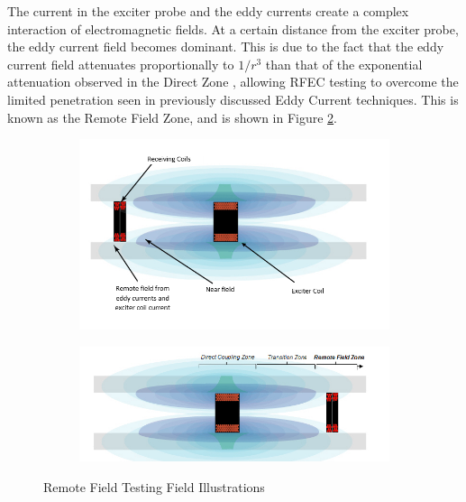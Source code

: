 \documentclass[a4paper,twoside,11pt]{article}
\begin{document}
The current in the exciter probe and the eddy currents create a complex interaction of electromagnetic fields. At a certain distance from the exciter probe, the eddy current field becomes dominant. This is due to the fact that the eddy current field attenuates proportionally to $1/r^3$ than that of the exponential attenuation observed in the Direct Zone \cite{sullivanComparisonConventionalThroughwall1989a}, allowing RFEC testing to overcome the limited penetration seen in previously discussed Eddy Current techniques.
This is known as the Remote Field Zone, and is shown in Figure \ref{fig:3.4B}.

\begin{figure}[H]
	\centering
	
	\begin{subfigure}[b]{0.75\textwidth}
		\centering
		\includegraphics[width=\textwidth]{RFET-2}
		\caption{}
		\label{fig:3.4A}
	\end{subfigure}
	\quad
	\begin{subfigure}[b]{0.75\textwidth}
		\centering
		\includegraphics[width=\textwidth]{RFET-1}
		\caption{}
		\label{fig:3.4B}
	\end{subfigure}
	\caption{Remote Field Testing Field Illustrations \cite{nde-edRFTIntro}}
	\label{fig:RFET}
\end{figure}
\end{document}

